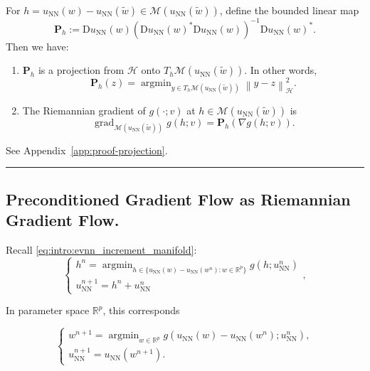 \documentclass[twoside,11pt]{article}
\newcommand{\BlackBoxProof}{\rule{1.5ex}{1.5ex}}
\renewenvironment{proof}{\par\noindent{\bf Proof\ }}{\hfill\BlackBoxProof\par\medskip}
\newcommand{\nm}[1]{\left\lVert#1\right\rVert}
\newcommand{\R}{\mathbb{R}}
\renewcommand{\P}{\mathbf{P}}
\newcommand{\D}{\mathrm{D}}
\newcommand{\NN}{\mathrm{NN}}
\newcommand{\argmin}{\mathop{\mathrm{arg min}}}
\begin{document}
\begin{proposition}\label{prop:projection}
For $h = u_\NN(w) - u_\NN(\tilde w)\in\mathcal{M}( u_\NN(\tilde w))$,
define the bounded linear map
\begin{equation}\label{eq:Projector}
\P_h:=\D u_\NN(w) \left(\D u_\NN (w)^*\D u_\NN (w) \right)^{-1} \D u_\NN (w)^*. 
\end{equation}
    Then we have: 
\begin{enumerate}
    \item[(a) ]$\P_h$ is a projection from $\mathcal{H}$ onto $T_h\mathcal{M}( u_\NN(\tilde w))$. In other words, 
    \[
    \P_h(z) = \argmin_{y \in T_h\mathcal{M}( u_\NN(\tilde w))} \nm{y - z}^2_{\mathcal{H}}. 
    \]
    
\item[(b)] The Riemannian gradient of $g(\cdot; v)$ at $h \in \mathcal{M}( u_\NN(\tilde w))$ is 
\begin{equation*}
\operatorname{grad}_{\mathcal{M}( u_\NN(\tilde w))} g(h; v)
   =\P_h \left( \nabla g(h; v) \right).
\end{equation*}
\end{enumerate}
\end{proposition}
\begin{proof}
See Appendix~\ref{app:proof-projection}.
\end{proof}

\subsection{Preconditioned Gradient Flow as Riemannian Gradient Flow.}
Recall \eqref{eq:intro:evnn_increment_manifold}:
\begin{equation*}
\begin{cases}
h ^{n}
= \displaystyle\argmin_{h\in \{u_\NN(w) - u_\NN(w^n): w \in \mathbb R^p \}} g(h; u_\NN^n)\\[1em]
u_\NN^{n+1} = h^{n} + u_\NN^n
\end{cases},
\end{equation*}

In parameter space $\mathbb R ^p$, this corresponds


\begin{equation}\label{eq:EVNN-param}
\begin{cases}
w^{n+1}=\argmin_{w\in\R^p}
g(u_\NN(w) - u_\NN(w^n);u_\NN^n),\\[1em]
u_\NN^{n+1}= u_\NN(w^{n+1}).
\end{cases}
\end{equation}
\end{document}
